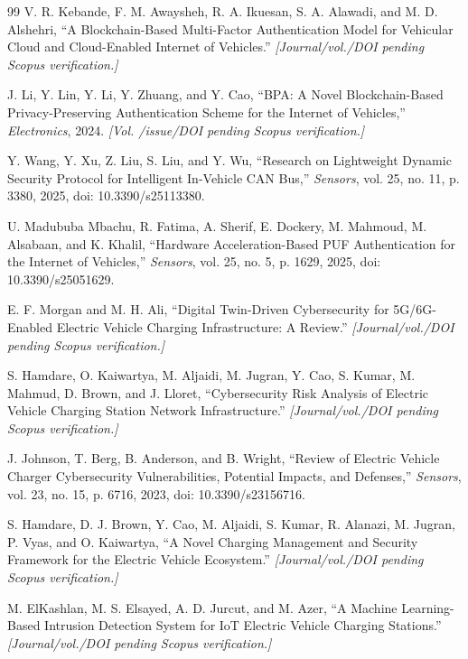 \documentclass[journal]{IEEEtran}
\begin{document}
\begin{thebibliography}{99}
		 V. R. Kebande, F. M. Awaysheh, R. A. Ikuesan, S. A.
		Alawadi, and M. D. Alshehri, ``A Blockchain-Based Multi-Factor
		Authentication Model for Vehicular Cloud and Cloud-Enabled Internet of
		Vehicles.'' \emph{[Journal/vol./DOI pending Scopus verification.]}
		
		 J. Li, Y. Lin, Y. Li, Y. Zhuang, and Y. Cao, ``BPA: A
		Novel Blockchain-Based Privacy-Preserving Authentication Scheme for
		the Internet of Vehicles,'' \emph{Electronics}, 2024. \emph{[Vol.
			/issue/DOI pending Scopus verification.]}
		
		 Y. Wang, Y. Xu, Z. Liu, S. Liu, and Y. Wu, ``Research
		on Lightweight Dynamic Security Protocol for Intelligent In-Vehicle
		CAN Bus,'' \emph{Sensors}, vol. 25, no. 11, p. 3380, 2025, doi:
		10.3390/s25113380.
		
		 U. Madububa Mbachu, R. Fatima, A. Sherif, E. Dockery,
		M. Mahmoud, M. Alsabaan, and K. Khalil, ``Hardware Acceleration-Based
		PUF Authentication for the Internet of Vehicles,'' \emph{Sensors},
		vol. 25, no. 5, p. 1629, 2025, doi: 10.3390/s25051629.
		
		 E. F. Morgan and M. H. Ali, ``Digital Twin-Driven
		Cybersecurity for 5G/6G-Enabled Electric Vehicle Charging
		Infrastructure: A Review.'' \emph{[Journal/vol./DOI pending Scopus
			verification.]}
		
		 S. Hamdare, O. Kaiwartya, M. Aljaidi, M. Jugran, Y.
		Cao, S. Kumar, M. Mahmud, D. Brown, and J. Lloret, ``Cybersecurity
		Risk Analysis of Electric Vehicle Charging Station Network
		Infrastructure.'' \emph{[Journal/vol./DOI pending Scopus
			verification.]}
		
		 J. Johnson, T. Berg, B. Anderson, and B. Wright,
		``Review of Electric Vehicle Charger Cybersecurity Vulnerabilities,
		Potential Impacts, and Defenses,'' \emph{Sensors}, vol. 23, no. 15,
		p. 6716, 2023, doi: 10.3390/s23156716.
		
		 S. Hamdare, D. J. Brown, Y. Cao, M. Aljaidi, S.
		Kumar, R. Alanazi, M. Jugran, P. Vyas, and O. Kaiwartya, ``A Novel
		Charging Management and Security Framework for the Electric Vehicle
		Ecosystem.'' \emph{[Journal/vol./DOI pending Scopus verification.]}
		
		 M. ElKashlan, M. S. Elsayed, A. D. Jurcut, and M.
		Azer, ``A Machine Learning-Based Intrusion Detection System for IoT
		Electric Vehicle Charging Stations.'' \emph{[Journal/vol./DOI
			pending Scopus verification.]}
		

\end{thebibliography}
\end{document}
